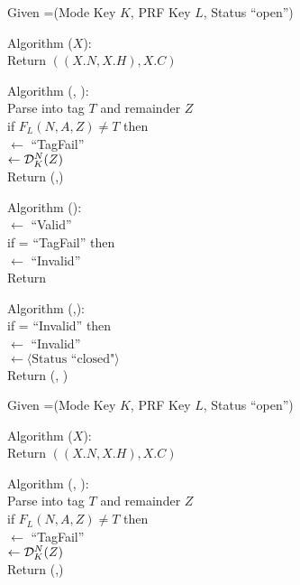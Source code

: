\begin{figure}
{
Given =(Mode Key $K$, PRF Key $L$, Status ``open'') 

\medskip
Algorithm ($X$):\\
\nudge Return $\left((X.N,X.H),X.C\right)$

\medskip
Algorithm (, ):\\
\nudge Parse  into tag $T$ and remainder $Z$\\ 
\nudge if $F_L(N,A,Z) \neq T$ then\\
\nudge\nudge {} $\gets$ ``TagFail''\\
\nudge{} $\gets \mathcal{D}_K^{N}(Z)$\\
\nudge Return (,)

\medskip
Algorithm ():\\
\nudge {} $\gets$ ``Valid''\\
\nudge if  =  ``TagFail'' then\\ 
\nudge\nudge {} $\gets$ ``Invalid''\\
\nudge Return 

\medskip
Algorithm (,):\\
\nudge if  = ``Invalid'' then \\
\nudge\nudge {} $\gets$ ``Invalid'' \\
\nudge\nudge {} $\gets \langle
\mbox{Status ``closed"} \rangle$\\
\nudge Return (, )
}
{
Given =(Mode Key $K$, PRF Key $L$, Status ``open'') 

\medskip
Algorithm ($X$):\\
\nudge Return $\left((X.N,X.H),X.C\right)$

\medskip
Algorithm (, ):\\
\nudge Parse  into tag $T$ and remainder $Z$\\ 
\nudge if $F_L(N,A,Z) \neq T$ then\\
\nudge\nudge {} $\gets$ ``TagFail''\\
\nudge{} $\gets \mathcal{D}_K^{N}(Z)$\\
\nudge Return (,)

}
\end{figure}
